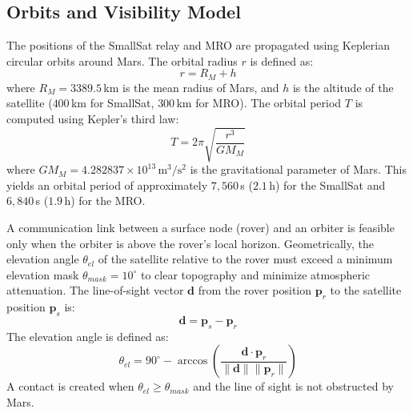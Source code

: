 \documentclass[a4paper,fleqn]{cas-dc}
\begin{document}
\subsection{Orbits and Visibility Model}
The positions of the SmallSat relay and MRO are propagated using Keplerian circular orbits around Mars. The orbital radius $r$ is defined as:
\begin{equation}
    r = R_M + h
\end{equation}
where $R_M = 3389.5\,$km is the mean radius of Mars, and $h$ is the altitude of the satellite ($400\,$km for SmallSat, $300\,$km for MRO). The orbital period $T$ is computed using Kepler's third law:
\begin{equation}
    T = 2\pi \sqrt{\frac{r^3}{GM_M}}
\end{equation}
where $GM_M = 4.282837 \times 10^{13}\,\text{m}^3/\text{s}^2$ is the gravitational parameter of Mars. This yields an orbital period of approximately $7{,}560\,$s ($2.1\,$h) for the SmallSat and $6{,}840\,$s ($1.9\,$h) for the MRO.

A communication link between a surface node (rover) and an orbiter is feasible only when the orbiter is above the rover's local horizon. Geometrically, the elevation angle $\theta_{el}$ of the satellite relative to the rover must exceed a minimum elevation mask $\theta_{mask} = 10^\circ$ to clear topography and minimize atmospheric attenuation. The line-of-sight vector $\mathbf{d}$ from the rover position $\mathbf{p}_r$ to the satellite position $\mathbf{p}_s$ is:
\begin{equation}
    \mathbf{d} = \mathbf{p}_s - \mathbf{p}_r
\end{equation}
The elevation angle is defined as:
\begin{equation}
    \theta_{el} = 90^\circ - \arccos\left(\frac{\mathbf{d} \cdot \mathbf{p}_r}{\|\mathbf{d}\| \|\mathbf{p}_r\|}\right)
\end{equation}
A contact is created when $\theta_{el} \geq \theta_{mask}$ and the line of sight is not obstructed by Mars.
\end{document}
